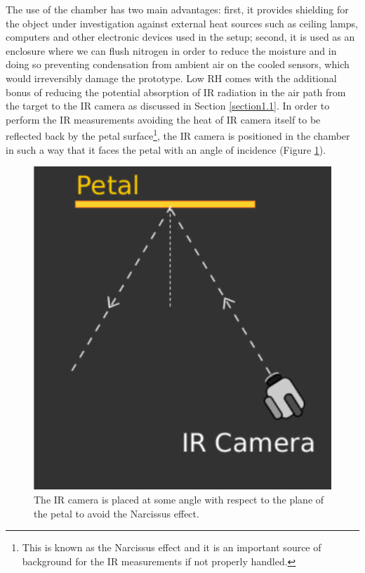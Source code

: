 		The use of the chamber has two main advantages: first, it provides shielding for the object under investigation against external heat sources such as ceiling lamps, computers and other electronic devices used in the setup; second, it is used as an enclosure where we can flush nitrogen in order to reduce the moisture and in doing so preventing condensation from ambient air on the cooled sensors, which would irreversibly damage the prototype. Low RH comes with the additional bonus of reducing the potential absorption of IR radiation in the air path from the target to the IR camera as discussed in Section \ref{section1.1}.
		In order to perform the IR measurements avoiding the heat of IR camera itself to be reflected back by the petal surface\footnote{{\footnotesize This is known as the Narcissus effect and it is an important source of background for the IR measurements if not properly handled.}}, the IR camera is positioned in the chamber in such a way that it faces the petal with an angle of incidence (Figure \ref{fig2.4}).	
		
		\begin{figure}[ht!]
			\centering
			\captionsetup{justification=centering,margin=2cm}
			\includegraphics[scale=0.25]{Figures/Chapter02/NarcissusEffect.jpg}
			\caption{The IR camera is placed at some angle with respect to the plane of the petal to avoid the Narcissus effect.}\label{fig2.4}
		\end{figure}\bigskip
		

